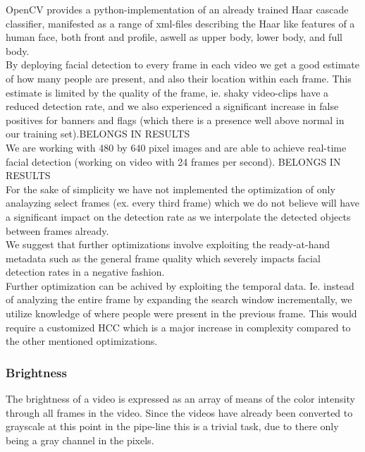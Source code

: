 %
OpenCV provides a python-implementation of an already trained Haar cascade classifier, manifested as a range of xml-files describing the Haar like features of a human face, both front and profile, aswell as upper body, lower body, and full body.\\
By deploying facial detection to every frame in each video we get a good estimate of how many people are present, and also their location within each frame. This estimate is limited by the quality of the frame, ie. shaky video-clips have a reduced detection rate, and we also experienced a significant increase in false positives for banners and flags (which there is a presence well above normal in our training set).BELONGS IN RESULTS\\
We are working with 480 by 640 pixel images and are able to achieve real-time facial detection (working on video with 24 frames per second). BELONGS IN RESULTS\\
For the sake of simplicity we have not implemented the optimization of only analayzing select frames (ex. every third frame) which we do not believe will have a significant impact on the detection rate as we interpolate the detected objects between frames already.\\
We suggest that further optimizations involve exploiting the ready-at-hand metadata such as the general frame quality which severely impacts facial detection rates in a negative fashion.\\
Further optimization can be achived by exploiting the temporal data. Ie. instead of analyzing the entire frame by expanding the search window incrementally, we utilize knowledge of where people were present in the previous frame. This would require a customized HCC which is a major increase in complexity compared to the other mentioned optimizations.
%
\subsubsection{Brightness}
%
The brightness of a video is expressed as an array of means
%
%
of the color intensity through all frames in the video. Since the videos have already been converted to grayscale at this point in the pipe-line this is a trivial task, due to there only being a gray channel in the pixels.
%
